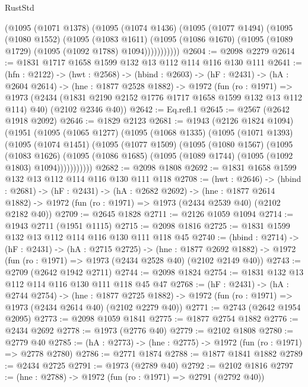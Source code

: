 \begin{lexlean}{RustStd}
\begin{coremodule}
          (@1095
            (@1071 @1378)
            (@1095
              (@1074 @1436)
              (@1095
                (@1077 @1494)
                (@1095
                  (@1080 @1552)
                  (@1095
                    (@1083 @1611)
                    (@1095 (@1086 @1670) (@1095 (@1089 @1729) (@1095 (@1092 @1788) @1094)))))))))))
@2604 := @2098 @2279
@2614 := @1831 @1717 @1658 @1599 @132 @13 @112 @114 @116 @130 @111
@2641 := (hfn : @2122) ->
  (hwt : @2568) ->
  (hbind : @2603) ->
  (hF : @2431) ->
  (hA : @2604 @2614) ->
  (hne : @1877 @2528 @1882) ->
  @1972
    (fun (ro : @1971) =>
    @1973
      (@2434 (@1831 @2190 @2152 @1776 @1717 @1658 @1599 @132 @13 @112 @114) @40)
      (@2102 @2346 @40))
@2642 := Eq.refl.{1}
@2645 := @2567 (@2642 @1918 @2092)
@2646 := @1829 @2123
@2681 := @1943
    (@2126 @1824 @1094)
    (@1951
      (@1095
        (@1065 @1277)
        (@1095
          (@1068 @1335)
          (@1095
            (@1071 @1393)
            (@1095
              (@1074 @1451)
              (@1095
                (@1077 @1509)
                (@1095
                  (@1080 @1567)
                  (@1095
                    (@1083 @1626)
                    (@1095 (@1086 @1685) (@1095 (@1089 @1744) (@1095 (@1092 @1803) @1094)))))))))))
@2682 := @2098 @1808
@2692 := @1831 @1658 @1599 @132 @13 @112 @114 @116 @130 @111 @118
@2708 := (hwt : @2646) ->
  (hbind : @2681) ->
  (hF : @2431) ->
  (hA : @2682 @2692) ->
  (hne : @1877 @2614 @1882) -> @1972 (fun (ro : @1971) => @1973 (@2434 @2539 @40) (@2102 @2182 @40))
@2709 := @2645 @1828
@2711 := @2126 @1059 @1094
@2714 := @1943 @2711 (@1951 @1115)
@2715 := @2098 @1816
@2725 := @1831 @1599 @132 @13 @112 @114 @116 @130 @111 @118 @45
@2740 := (hbind : @2714) ->
  (hF : @2431) ->
  (hA : @2715 @2725) ->
  (hne : @1877 @2692 @1882) -> @1972 (fun (ro : @1971) => @1973 (@2434 @2528 @40) (@2102 @2149 @40))
@2743 := @2709 (@2642 @1942 @2711)
@2744 := @2098 @1824
@2754 := @1831 @132 @13 @112 @114 @116 @130 @111 @118 @45 @47
@2768 := (hF : @2431) ->
  (hA : @2744 @2754) ->
  (hne : @1877 @2725 @1882) -> @1972 (fun (ro : @1971) => @1973 (@2434 @2614 @40) (@2102 @2279 @40))
@2771 := @2743 (@2642 @1954 @2095)
@2773 := @2098 @1059 @1841
@2775 := @1877 @2754 @1882
@2776 := @2434 @2692
@2778 := @1973 (@2776 @40)
@2779 := @2102 @1808
@2780 := @2779 @40
@2785 := (hA : @2773) -> (hne : @2775) -> @1972 (fun (ro : @1971) => @2778 @2780)
@2786 := @2771 @1874
@2788 := @1877 @1841 @1882
@2789 := @2434 @2725
@2791 := @1973 (@2789 @40)
@2792 := @2102 @1816
@2797 := (hne : @2788) -> @1972 (fun (ro : @1971) => @2791 (@2792 @40))

\end{coremodule}
\end{lexlean}
